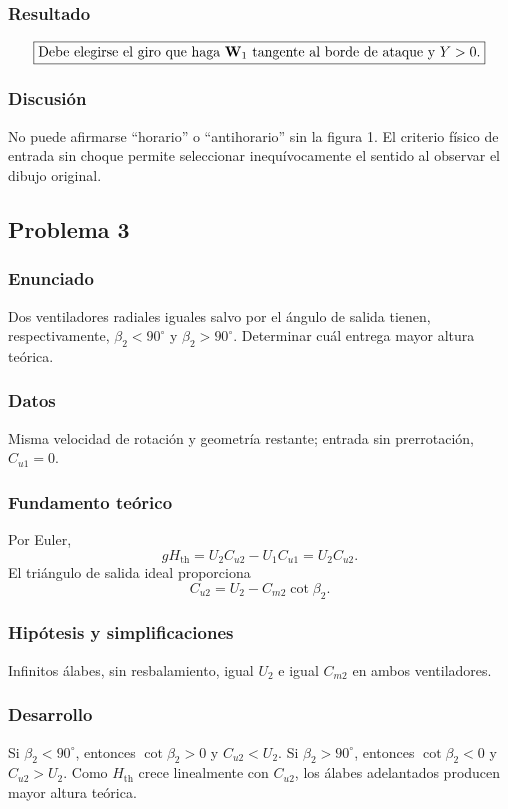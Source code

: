 \documentclass[12pt]{article}
\newcommand{\resultado}[1]{\[
  \boxed{\displaystyle #1}
\]}
\begin{document}
\subsubsection*{Resultado}
\resultado{\text{Debe elegirse el giro que haga }\vb W_1
\text{ tangente al borde de ataque y }Y>0.}

\subsubsection*{Discusión}
No puede afirmarse ``horario'' o ``antihorario'' sin la figura 1. El criterio físico de entrada
sin choque permite seleccionar inequívocamente el sentido al observar el dibujo original.

\subsection{Problema 3}

\subsubsection*{Enunciado}
Dos ventiladores radiales iguales salvo por el ángulo de salida tienen, respectivamente,
$\beta_2<90^\circ$ y $\beta_2>90^\circ$. Determinar cuál entrega mayor altura teórica.

\subsubsection*{Datos}
Misma velocidad de rotación y geometría restante; entrada sin prerrotación,
$C_{u1}=0$.

\subsubsection*{Fundamento teórico}
Por Euler,
\[
gH_{\mathrm{th}}=U_2C_{u2}-U_1C_{u1}=U_2C_{u2}.
\]
El triángulo de salida ideal proporciona
\[
C_{u2}=U_2-C_{m2}\cot\beta_2.
\]

\subsubsection*{Hipótesis y simplificaciones}
Infinitos álabes, sin resbalamiento, igual $U_2$ e igual $C_{m2}$ en ambos ventiladores.

\subsubsection*{Desarrollo}
Si $\beta_2<90^\circ$, entonces $\cot\beta_2>0$ y
$C_{u2}<U_2$. Si $\beta_2>90^\circ$, entonces $\cot\beta_2<0$ y
$C_{u2}>U_2$. Como $H_{\mathrm{th}}$ crece linealmente con $C_{u2}$, los álabes adelantados
producen mayor altura teórica.
\end{document}
